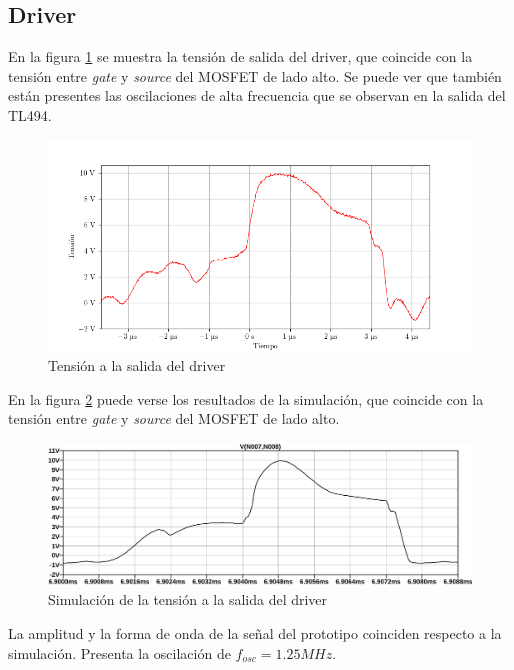 




\subsection{Driver}

En la figura \ref{fig:driver_vout_connected} se muestra la tensión de salida del driver, que coincide con la tensión entre \textit{gate} y \textit{source} del MOSFET de lado alto.
Se puede ver que también están presentes las oscilaciones de alta frecuencia que se observan en la salida del TL494.

\begin{figure}[H]
    \centering
    \includegraphics[width=\textwidth]{images/capturas-osciloscopio/17-11-2022/31.png} %
    \caption{Tensión a la salida del driver}
    \label{fig:driver_vout_connected}
\end{figure}

En la figura \ref{fig:sim:driver_vout_connected} puede verse los resultados de la simulación,
que coincide con la tensión entre \textit{gate} y \textit{source} del MOSFET de lado alto.

\begin{figure}[H]
    \centering
    \includegraphics[width=\textwidth]{images/sim/15.pdf}
    \caption{Simulación de la tensión a la salida del driver}
    \label{fig:sim:driver_vout_connected}
\end{figure}
La amplitud y la forma de onda de la señal del prototipo coinciden respecto a la simulación. Presenta la oscilación de $f_{osc}=1.25MHz$.

